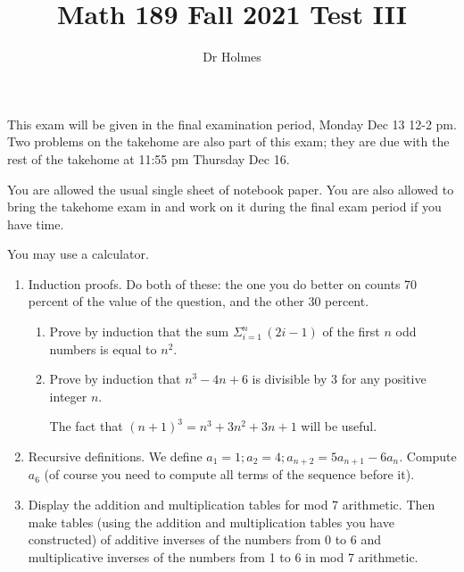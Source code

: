 \documentclass[12pt]{article}
\title{Math 189 Fall 2021 Test III}
\author{Dr Holmes}
\begin{document}
\maketitle

This exam will be given in the final examination period, Monday Dec 13 12-2 pm.  Two problems on the takehome are also part of this exam;  they are due with the rest of the takehome at 11:55 pm Thursday Dec 16.

You are allowed the usual single sheet of notebook paper.  You are also allowed to bring the takehome exam in and work on it during the final exam period if you have time.

You may use a calculator.

\newpage

\begin{enumerate}

\item  Induction proofs.  Do both of these:  the one you do better on counts 70 percent of the value of the question, and the other 30 percent.

\begin{enumerate}

\item  Prove by induction that the sum $\Sigma_{i=1}^n \, (2i-1)$ of the first $n$ odd numbers is equal to $n^2$.

\newpage

\item  Prove by induction that $n^3 -4n + 6$ is divisible by 3 for any positive integer $n$.

The fact that $(n+1)^3 = n^3 + 3n^2 + 3n +1$ will be useful.

\end{enumerate}

\newpage

\item   Recursive definitions.  We define $a_1=1; a_2 = 4; a_{n+2} = 5a_{n+1}-6a_n$.  Compute $a_6$ (of course you need to compute all terms of the sequence before it).

\newpage

\item   Display the addition and multiplication tables for mod 7 arithmetic.  Then make tables (using the addition and multiplication tables you have constructed) of additive inverses of the numbers from 0 to 6 and multiplicative inverses of the numbers from 1 to 6 in mod 7 arithmetic.

\newpage


\end{enumerate}
\end{document}

